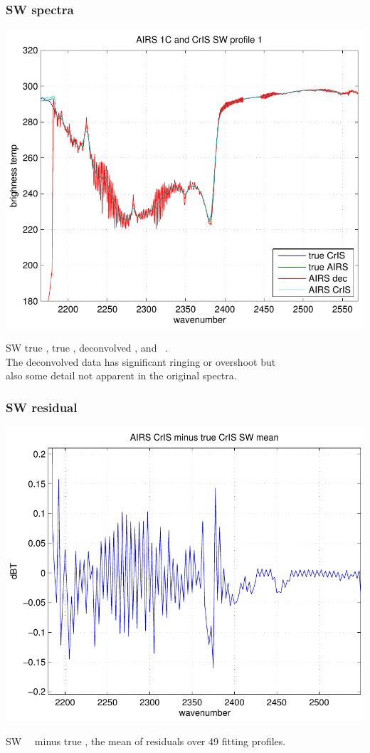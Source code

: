 \documentclass[11pt]{beamer}
\begin{document}
\begin{frame}
\frametitle{SW spectra}

\begin{center}
  \includegraphics[scale=0.54]{figures/fig_1_SW.pdf}
\end{center}

SW true \cris, true \airs, deconvolved \airs, and \airs\ \cris.  \\
The deconvolved data has significant ringing or overshoot but \\ 
also some detail not apparent in the original spectra.

\end{frame}
\begin{frame}
\frametitle{SW residual}

\begin{center}
  \includegraphics[scale=0.54]{figures/fig_2_SW.pdf}
\end{center}

SW \airs\ \cris\ minus true \cris, the mean of residuals over 49
fitting profiles.

\end{frame}
\end{document}
